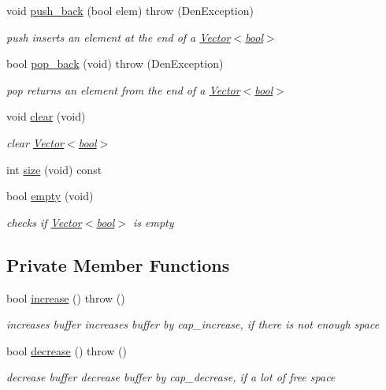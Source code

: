 \begin{DoxyCompactItemize}
void \hyperlink{classVector_3_01bool_01_4_a8ea33e431ec6cd90840a392f84aefdae}{push\+\_\+back} (bool elem)  throw (\+Den\+Exception)
\begin{DoxyCompactList}\small\item\em push  inserts an element at the end of a \hyperlink{classVector_3_01bool_01_4}{Vector$<$bool$>$} \end{DoxyCompactList}\item 
bool \hyperlink{classVector_3_01bool_01_4_a1cdf4ddfa0fe85a75b0a32767d969814}{pop\+\_\+back} (void)  throw (\+Den\+Exception)
\begin{DoxyCompactList}\small\item\em pop  returns an element from the end of a \hyperlink{classVector_3_01bool_01_4}{Vector$<$bool$>$} \end{DoxyCompactList}\item 
\mbox{\label{classVector_3_01bool_01_4_a1d1d0fe8ed29d8a689e9fe7aec95bc37}} 
void \hyperlink{classVector_3_01bool_01_4_a1d1d0fe8ed29d8a689e9fe7aec95bc37}{clear} (void)
\begin{DoxyCompactList}\small\item\em clear \hyperlink{classVector_3_01bool_01_4}{Vector$<$bool$>$} \end{DoxyCompactList}\item 
int \hyperlink{classVector_3_01bool_01_4_acb9a245334b171ea1ad0d9bda20da76e}{size} (void) const
\item 
bool \hyperlink{classVector_3_01bool_01_4_a830fa9ddb2e3b9b000ecd6a15f51f6c2}{empty} (void)
\begin{DoxyCompactList}\small\item\em checks if \hyperlink{classVector_3_01bool_01_4}{Vector$<$bool$>$} is empty \end{DoxyCompactList}\end{DoxyCompactItemize}
\subsection*{Private Member Functions}
\begin{DoxyCompactItemize}
\item 
bool \hyperlink{classVector_3_01bool_01_4_afebfb559bb1f4b771fe43b5d2a94a3d7}{increase} ()  throw ()
\begin{DoxyCompactList}\small\item\em increases buffer  increases buffer by cap\+\_\+increase, if there is not enough space \end{DoxyCompactList}\item 
bool \hyperlink{classVector_3_01bool_01_4_a39afbd4a74eac5e2eb4363eed1f98adf}{decrease} ()  throw ()
\begin{DoxyCompactList}\small\item\em decrease buffer  decrease buffer by cap\+\_\+decrease, if a lot of free space \end{DoxyCompactList}\end{DoxyCompactItemize}
